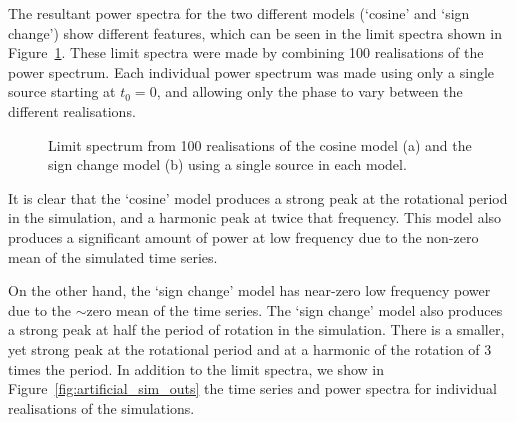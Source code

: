 The resultant power spectra for the two different models (`cosine' and `sign change') show different features, which can be seen in the limit spectra shown in Figure~\ref{fig:artificial_LS}. These limit spectra were made by combining 100 realisations of the power spectrum. Each individual power spectrum was made using only a single source starting at $t_0 = 0$, and allowing only the phase to vary between the different realisations.

\begin{figure}[ht!]
	\centering
	\qquad
	\caption{Limit spectrum from 100 realisations of the cosine model (a) and the sign change model (b) using a single source in each model.}  \label{fig:artificial_LS}
\end{figure}

It is clear that the `cosine' model produces a strong peak at the rotational period in the simulation, and a harmonic peak at twice that frequency. This model also produces a significant amount of power at low frequency due to the non-zero mean of the simulated time series. 

On the other hand, the `sign change' model has near-zero low frequency power due to the $\sim$zero mean of the time series. The `sign change' model also produces a strong peak at half the period of rotation in the simulation. There is a smaller, yet strong peak at the rotational period and at a harmonic of the rotation of 3 times the period. In addition to the limit spectra, we show in Figure~\ref{fig:artificial_sim_outs} the time series and power spectra for individual realisations of the simulations.


